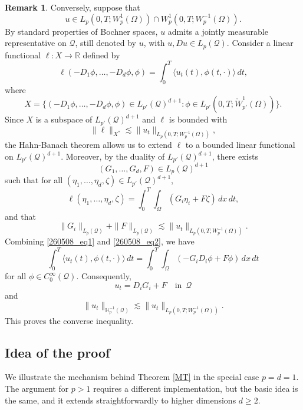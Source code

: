 \documentclass[reqno]{amsart}
\numberwithin{equation}{section}
\theoremstyle{plain}
\theoremstyle{definition}
\newtheorem{remark}[theorem]{Remark}
\def\bR{\mathbb{R}}
\def\cQ{\mathcal{Q}}
\begin{document}
\begin{remark}
Conversely, suppose that 
$$
u\in L_p(0,T;W^1_p(\Omega))\cap W^1_p(0,T; W^{-1}_{p}(\Omega)).
$$
By standard properties of Bochner spaces, $u$ admits a jointly measurable representative on $\cQ$, still denoted by $u$, with $u, Du \in L_p(\cQ)$.
Consider a linear functional $\ell:X\to \bR$ defined by 
\begin{equation}		\label{260508_eq1}
\ell(-D_1\phi,\ldots, -D_d\phi, \phi)=\int_0^T \langle u_t(t), \phi(t, \cdot)\rangle \,dt,
\end{equation}
where
$$
X=\{(-D_1\phi, \ldots, -D_d\phi, \phi) \in L_{p'}(\cQ)^{d+1}: \phi\in L_{p'}(0,T;\mathring{W}^1_{p'}(\Omega))\}.
$$
Since $X$ is a subspace of $L_{p'}(\cQ)^{d+1}$ and $\ell$ is bounded with
$$
\|\ell\|_{X^*}\lesssim \|u_t\|_{L_p(0,T; W^{-1}_p(\Omega))}, 
$$
the Hahn-Banach theorem allows us to extend $\ell$ to a bounded linear functional on $L_{p'}(\cQ)^{d+1}$.
Moreover, by the duality of $L_{p'}(\cQ)^{d+1}$, there exists
$$
(G_1, \ldots, G_d, F)\in L_p(\cQ)^{d+1}
$$
such that for all $(\eta_1,\ldots,\eta_d, \zeta)\in L_{p'}(\cQ)^{d+1}$,
\begin{equation}		\label{260508_eq2}
\ell(\eta_1,\ldots, \eta_d, \zeta)=\int_{0}^T\int_{\Omega} (G_i \eta_i+F\zeta)\,dx\,dt, 
\end{equation}
and that 
$$
\|G_i\|_{L_p(\cQ)}+\|F\|_{L_p(\cQ)}\lesssim \|u_t\|_{L_p(0,T;W^{-1}_p(\Omega))}.
$$
Combining \eqref{260508_eq1} and \eqref{260508_eq2}, we have 
$$
\int_0^T \langle u_t(t), \phi(t, \cdot)\rangle \,dt=\int_{0}^T\int_{\Omega} (-G_i D_i \phi+F \phi)\,dx\,dt
$$
for all $\phi\in C^\infty_0(\cQ)$.
Consequently, 
$$
u_t=D_iG_i+F \quad\text{in }\, \cQ
$$
and
$$
\|u_t\|_{\mathbb H^{-1}_p(\cQ)}\lesssim\|u_t\|_{L_p(0,T;W^{-1}_p(\Omega))}.
$$
This proves the converse inequality.
\end{remark}


\subsection{Idea of the proof}		\label{S1_2}

We illustrate the mechanism behind Theorem \ref{MT} in the special case $p=d=1$.
The argument for $p>1$ requires a different implementation, but the basic idea is the same, and it extends straightforwardly to higher dimensions $d\ge 2$.
\end{document}
